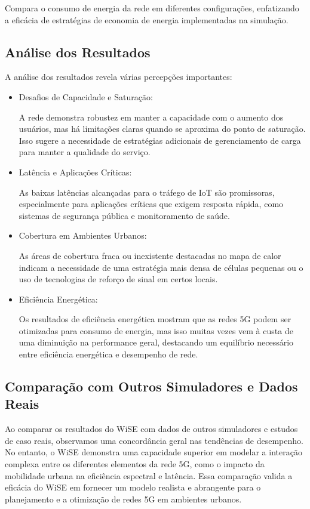 \documentclass[journal]{IEEEtran}
\begin{document}
Compara o consumo de energia da rede em diferentes configurações, enfatizando a eficácia de estratégias de economia de energia implementadas na simulação.

\subsection{Análise dos Resultados}

A análise dos resultados revela várias percepções importantes:

\begin{itemize}
  \item Desafios de Capacidade e Saturação:
  
  A rede demonstra robustez em manter a capacidade com o aumento dos usuários, mas há limitações claras quando se aproxima do ponto de saturação. Isso sugere a necessidade de estratégias adicionais de gerenciamento de carga para manter a qualidade do serviço.
  
  \item Latência e Aplicações Críticas:
  
  As baixas latências alcançadas para o tráfego de IoT são promissoras, especialmente para aplicações críticas que exigem resposta rápida, como sistemas de segurança pública e monitoramento de saúde.
  
  \item Cobertura em Ambientes Urbanos:
  
  As áreas de cobertura fraca ou inexistente destacadas no mapa de calor indicam a necessidade de uma estratégia mais densa de células pequenas ou o uso de tecnologias de reforço de sinal em certos locais.
  
  \item Eficiência Energética:
  
  Os resultados de eficiência energética mostram que as redes 5G podem ser otimizadas para consumo de energia, mas isso muitas vezes vem à custa de uma diminuição na performance geral, destacando um equilíbrio necessário entre eficiência energética e desempenho de rede.
\end{itemize}

\subsection{Comparação com Outros Simuladores e Dados Reais}

Ao comparar os resultados do WiSE com dados de outros simuladores e estudos de caso reais, observamos uma concordância geral nas tendências de desempenho. No entanto, o WiSE demonstra uma capacidade superior em modelar a interação complexa entre os diferentes elementos da rede 5G, como o impacto da mobilidade urbana na eficiência espectral e latência. Essa comparação valida a eficácia do WiSE em fornecer um modelo realista e abrangente para o planejamento e a otimização de redes 5G em ambientes urbanos.
\end{document}
